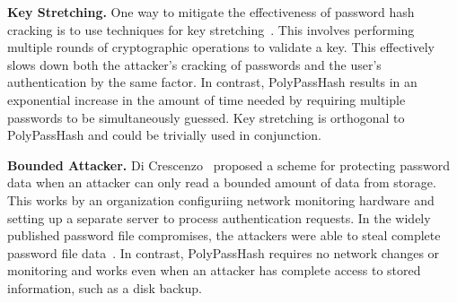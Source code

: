 {\bf Key Stretching.}
One way to mitigate the effectiveness of password hash cracking is to
use techniques for key stretching~\cite{kelsey1998secure}.   This involves
performing multiple rounds of cryptographic operations to validate a key.
This effectively slows down both the attacker's cracking of passwords and the
user's authentication by the same factor.   In contrast, PolyPassHash results 
in an exponential increase in the amount of time needed by requiring multiple
passwords to be simultaneously guessed.  Key stretching is orthogonal
to PolyPassHash and could be trivially used in conjunction.




{\bf Bounded Attacker.}
Di Crescenzo~\cite{di2006perfectly} proposed a scheme for protecting
password data when an attacker can only read a bounded amount of data from 
storage.   This works by an organization configuriing
network monitoring hardware and setting up a separate server to process 
authentication requests.
In the widely published password file compromises, the 
attackers were able to steal complete password file 
data~\cite{miranteTR13,passwordresearchblog}.   In contrast, 
PolyPassHash requires no network changes or monitoring and works even when an 
attacker has complete access to stored information, such as a disk backup.

